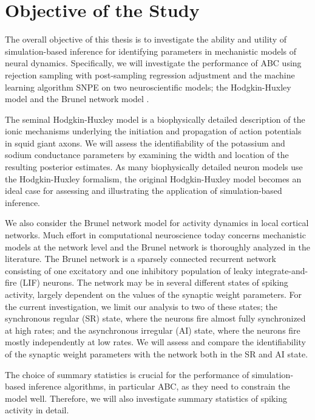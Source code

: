 \section{Objective of the Study}

The overall objective of this thesis is to investigate the ability and utility of simulation-based inference for identifying parameters in mechanistic models of neural dynamics. Specifically, we will investigate the performance of ABC using rejection sampling with post-sampling regression adjustment and the machine learning algorithm SNPE on two neuroscientific models; the Hodgkin-Huxley model \cite{HH1952} and the Brunel network model \cite{Brunel2000}. 

The seminal Hodgkin-Huxley model is a biophysically detailed description of the ionic mechanisms underlying the initiation and propagation of action potentials in squid giant axons. We will assess the identifiability of the potassium and sodium conductance parameters by examining the width and location of the resulting posterior estimates. As many biophysically detailed neuron models use the Hodgkin-Huxley formalism, the original Hodgkin-Huxley model becomes an ideal case for assessing and illustrating the application of simulation-based inference. 

We also consider the Brunel network model for activity dynamics in local cortical networks. Much effort in computational neuroscience today concerns mechanistic models at the network level and the Brunel network is thoroughly analyzed in the literature. The Brunel network is a sparsely connected recurrent network consisting of one excitatory and one inhibitory population of leaky integrate-and-fire (LIF) neurons. The network may be in several different states of spiking activity, largely dependent on the values of the synaptic weight parameters. For the current investigation, we limit our analysis to two of these states; the synchronous regular (SR) state, where the neurons fire almost fully synchronized at high rates; and the asynchronous irregular (AI) state, where the neurons fire mostly independently at low rates. We will assess and compare the identifiability of the synaptic weight parameters with the network both in the SR and AI state. 

The choice of summary statistics is crucial for the performance of simulation-based inference algorithms, in particular ABC, as they need to constrain the model well. Therefore, we will also investigate summary statistics of spiking activity in detail. 

